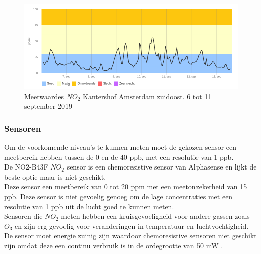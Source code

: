 \documentclass[a4paper, 11pt]{article} %
\begin{document}
	\begin{figure}
		\centering
		\includegraphics[width=.9\linewidth]{afbeeldingen/amsterdam.png}
		\caption{Meetwaardes $NO_2$ Kantershof Amsterdam zuidoost. 6 tot 11 september 2019 \cite{grafiek}}
		\label{fig:grafiek}
	\end{figure}
	
	\newpage
	\subsubsection{Sensoren}
	Om de voorkomende niveau's te kunnen meten moet de gekozen sensor een meetbereik hebben tussen de 0 en de 40 ppb, met een resolutie van 1 ppb.\\
	De NO2-B43F $NO_2$ sensor is een chemoresistive sensor van Alphasense en lijkt de beste optie maar is niet geschikt.\\
	Deze sensor een meetbereik van 0 tot 20 ppm met een meetonzekerheid van 15 ppb. Deze sensor is niet gevoelig genoeg om de lage concentraties met een resolutie van 1 ppb uit de lucht goed te kunnen meten.\\ 
	Sensoren die $NO_2$ meten hebben een kruisgevoeligheid voor andere gassen zoals $O_3$ en zijn erg gevoelig voor veranderingen in temperatuur en luchtvochtigheid. \\
	De sensor moet energie zuinig zijn waardoor chemoresistive sensoren niet geschikt zijn omdat deze een continu verbruik is in de ordegrootte van 50 mW \cite{B4DF}. 
	
\end{document}
